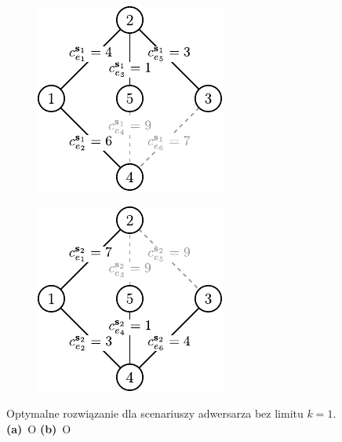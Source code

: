 \begin{figure}[!htbp]
	\null\hfill
	\begin{subfigure}[b]{0.4\textwidth}
		\includegraphics[width=\textwidth]{Chapter_II/ROB-INC-MST-example/d1}
		\caption{}
		\label{fig:robincrexampleopt:a}
	\end{subfigure}
	\hfill
	\begin{subfigure}[b]{0.4\textwidth}
		\includegraphics[width=\textwidth]{Chapter_II/ROB-INC-MST-example/d2}
		\caption{}
		\label{fig:robincrexampleopt:b}
	\end{subfigure}
	\hfill\null
	\caption{
		Optymalne rozwiązanie dla scenariuszy adwersarza bez limitu $k=1$.
		\textbf{(a)}~O
		\textbf{(b)}~O
	}
	\label{fig:robincrexampleopt}
\end{figure}


